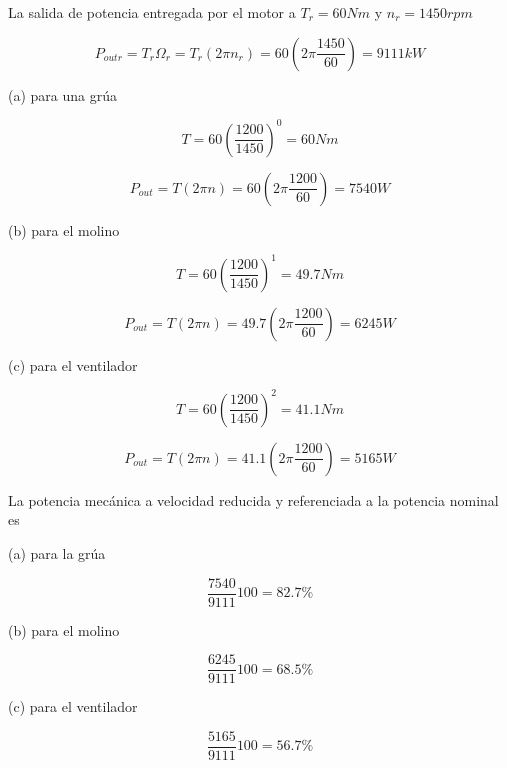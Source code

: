 \documentclass[12pt]{book}
\theoremstyle{definition}
\theoremstyle{remark}
\theoremstyle{plain}
\begin{document}
La salida de potencia entregada por el motor a $T_r= 60 Nm$ y $n_r=1450 rpm$

\begin{equation*}
P_{outr}=T_r \Omega _r = T_r (2 \pi n_r) = 60 (2 \pi \frac{1450}{60}) = 9111 kW
 \end{equation*}

(a) para una grúa 

\begin{equation*}
T = 60 (\frac{1200}{1450})^0=60 Nm
\end{equation*}

\begin{equation*}
P_{out}=T(2 \pi n)=60 (2 \pi \frac{1200}{60})= 7540 W
\end{equation*}

(b) para el molino

\begin{equation*}
T = 60 (\frac{1200}{1450})^1=49.7 Nm
\end{equation*}

\begin{equation*}
P_{out}=T(2 \pi n)=49.7 (2 \pi \frac{1200}{60})= 6245 W
\end{equation*}

(c) para el ventilador

\begin{equation*}
T = 60 (\frac{1200}{1450})^2=41.1 Nm
\end{equation*}

\begin{equation*}
P_{out}=T(2 \pi n)=41.1 (2 \pi \frac{1200}{60})= 5165 W
\end{equation*}

La potencia mecánica a velocidad reducida y referenciada a la potencia nominal es

(a) para la grúa

\begin{equation*}
\frac{7540}{9111}100=82.7 \%
\end{equation*}

(b) para el molino

\begin{equation*}
\frac{6245}{9111}100=68.5 \%
\end{equation*}

(c) para el ventilador

\begin{equation*}
\frac{5165}{9111}100=56.7 \%
\end{equation*}
\end{document}
